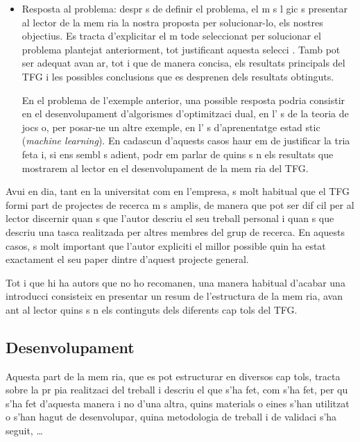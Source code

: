 \begin{itemize}
   \item Resposta al problema: despr s de definir el problema, el m s l gic  s presentar al lector de la mem ria la nostra proposta per solucionar-lo, els nostres objectius. Es tracta d'explicitar el m tode seleccionat per solucionar el problema plantejat anteriorment, tot justificant aquesta selecci . Tamb  pot ser adequat avan ar, tot i que de manera concisa, els resultats principals del TFG i les possibles conclusions que es desprenen dels resultats obtinguts.

       En el problema de l'exemple anterior, una possible resposta podria consistir en el desenvolupament d'algorismes d'optimitzaci  dual, en l' s de la teoria de jocs o, per posar-ne un altre exemple, en l' s d'aprenentatge estad stic (\emph{machine learning}). En cadascun d'aquests casos haur em de justificar la tria feta i, si ens sembl s adient, podr em parlar de quins s n els resultats que mostrarem al lector en el desenvolupament de la mem ria del TFG.

\end{itemize}


Avui en dia, tant en la universitat com en l'empresa,  s molt habitual que el TFG formi part de projectes de recerca m s amplis, de manera que pot ser dif cil per al lector discernir quan  s que l'autor descriu el seu treball personal i quan  s que descriu una tasca realitzada per altres membres del grup de recerca. En aquests casos,  s molt important que l'autor expliciti el millor possible quin ha estat exactament el seu paper dintre d'aquest projecte general.

Tot i que hi ha autors que no ho recomanen, una manera habitual d'acabar una introducci  consisteix en presentar un resum de l'estructura de la mem ria, avan ant al lector quins s n els continguts dels diferents cap tols del TFG.


\subsection{Desenvolupament}

Aquesta part de la mem ria, que es pot estructurar en diversos cap tols, tracta sobre la pr pia realitzaci  del treball i descriu el que s'ha fet, com s'ha fet, per qu  s'ha fet d'aquesta manera i no d'una altra, quins materials o eines s'han utilitzat o s'han hagut de desenvolupar, quina metodologia de treball i de validaci  s'ha seguit, \ldots

